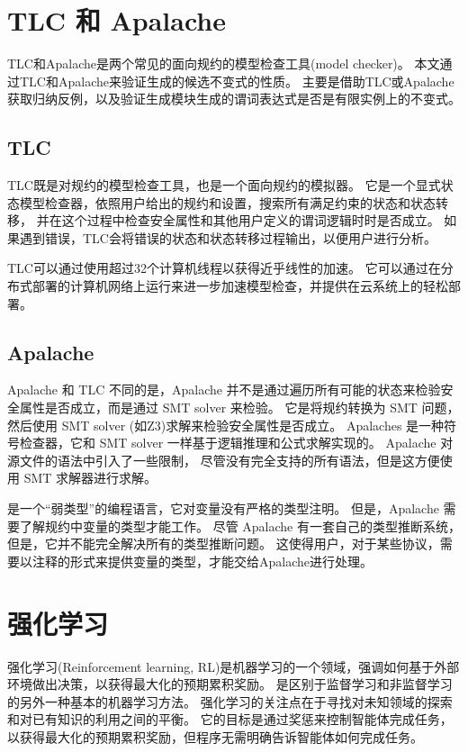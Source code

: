 \section{TLC 和 Apalache}\label{sec:tlc-apalache}
TLC和Apalache是两个常见的面向\TLA 规约的模型检查工具(model checker)。
本文通过TLC和Apalache来验证生成的候选不变式的性质。
主要是借助TLC或Apalache获取归纳反例，以及验证生成模块生成的谓词表达式是否是有限实例上的不变式。

\subsection{TLC}
TLC既是对\TLA 规约的模型检查工具，也是一个面向规约的模拟器。
它是一个显式状态模型检查器，依照用户给出的规约和设置，搜索所有满足约束的状态和状态转移，
并在这个过程中检查安全属性和其他用户定义的谓词逻辑时时是否成立。
如果遇到错误，TLC会将错误的状态和状态转移过程输出，以便用户进行分析。

TLC可以通过使用超过32个计算机线程以获得近乎线性的加速。
它可以通过在分布式部署的计算机网络上运行来进一步加速模型检查，并提供在云系统上的轻松部署。

\subsection{Apalache}
Apalache\cite{apalache1, apalache2} 和 TLC 不同的是，Apalache 并不是通过遍历所有可能的状态来检验安全属性是否成立，而是通过 SMT solver 来检验。
它是将\TLA 规约转换为 SMT 问题，然后使用 SMT solver (如Z3\cite{z3})求解来检验安全属性是否成立。
Apalaches 是一种符号检查器，它和 SMT solver 一样基于逻辑推理和公式求解实现的。
Apalache 对\TLA 源文件的语法中引入了一些限制，
尽管没有完全支持\TLA 的所有语法，但是这方便使用 SMT 求解器进行求解。

\TLA 是一个“弱类型”的编程语言，它对变量没有严格的类型注明。
但是，Apalache 需要了解\TLA 规约中变量的类型才能工作。
尽管 Apalache 有一套自己的类型推断系统，但是，它并不能完全解决所有的类型推断问题。
这使得用户，对于某些协议，需要以注释的形式来提供变量的类型，才能交给Apalache进行处理。


\section{强化学习}
强化学习(Reinforcement learning, RL)\cite{rl}是机器学习的一个领域，强调如何基于外部环境做出决策，以获得最大化的预期累积奖励。
是区别于监督学习和非监督学习的另外一种基本的机器学习方法。
强化学习的关注点在于寻找对未知领域的探索和对已有知识的利用之间的平衡。
它的目标是通过奖惩来控制智能体完成任务，以获得最大化的预期累积奖励，但程序无需明确告诉智能体如何完成任务。

